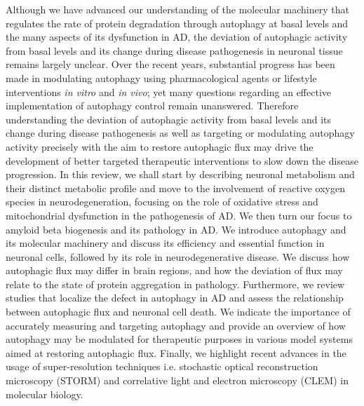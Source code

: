 Although we have advanced our understanding of the molecular machinery that regulates the rate of protein degradation through autophagy at basal levels and the many aspects of its dysfunction in AD, the deviation of autophagic activity from basal levels and its change during disease pathogenesis in neuronal tissue remains largely unclear. Over the recent years, substantial progress has been made in modulating autophagy using pharmacological agents \citep{Berger2006,Hebron2013,Ravikumar2002,Ravikumar2004,Rose2010} or lifestyle interventions \citep{Alirezaei2010,Kuma2004,Mizushima2004a,Scott2004} \textit{in vitro} and \textit{in vivo}; yet many questions regarding an effective implementation of autophagy control remain unanswered. Therefore understanding the deviation of autophagic activity from basal levels and its change during disease pathogenesis as well as targeting or modulating autophagy activity precisely with the aim to restore autophagic flux may drive the development of better targeted therapeutic interventions to slow down the disease progression. In this review, we shall start by describing neuronal metabolism and their distinct metabolic profile and move to the involvement of reactive oxygen species in neurodegeneration, focusing on the role of oxidative stress and mitochondrial dysfunction in the pathogenesis of AD. We then turn our focus to amyloid beta biogenesis and its pathology in AD. We introduce autophagy and its molecular machinery and discuss its efficiency and essential function in neuronal cells, followed by its role in neurodegenerative disease. We discuss how autophagic flux may differ in brain regions, and how the deviation of flux may relate to the state of protein aggregation in pathology. Furthermore, we review studies that localize the defect in autophagy in AD and assess the relationship between autophagic flux and neuronal cell death. We indicate the importance of accurately measuring and targeting autophagy and provide an overview of how autophagy may be modulated for therapeutic purposes in various model systems aimed at restoring autophagic flux. Finally, we highlight recent advances in the usage of super-resolution techniques i.e. stochastic optical reconstruction microscopy (STORM) and correlative light and electron microscopy (CLEM) in molecular biology. 


